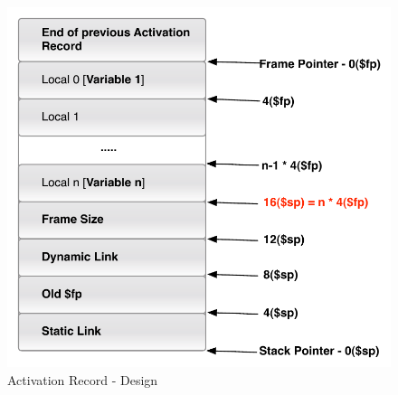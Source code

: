 \begin{figure}[p]
	\includegraphics[scale=0.6]{ar-include.pdf}
	\caption{Activation Record - Design}
	\label{fig:AR}
\end{figure}